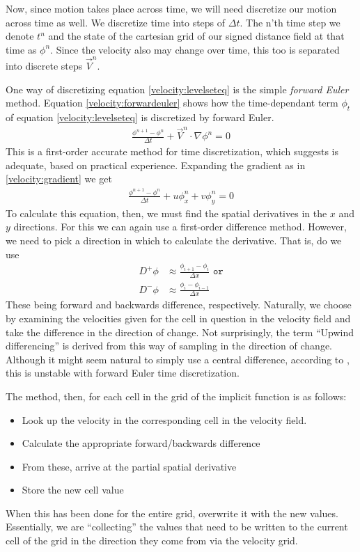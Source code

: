 Now, since motion takes place across time, we will need discretize our
motion across time as well. We discretize time into steps of $\Delta
t$. The n'th time step we denote $t^n$ and the state of the cartesian
grid of our signed distance field at that time as $\phi^n$. Since the
velocity also may change over time, this too is separated into
discrete steps $\vec{V}^n$.

One way of discretizing equation \ref{velocity:levelseteq} is the
simple \emph{forward Euler} method. Equation
\vref{velocity:forwardeuler} shows how the time-dependant term
$\phi_t$ of equation \ref{velocity:levelseteq} is discretized by
forward Euler.
\begin{align}
  \label{velocity:forwardeuler}
  \frac{\phi^{n+1}-\phi^n}{\Delta t}+\vec{V}^n\cdot\nabla\phi^n = 0
\end{align}
This is a first-order accurate method for time discretization, which
 suggests is adequate, based on practical
experience.  Expanding the gradient as in \vref{velocity:gradient} we
get
\begin{align}
  \label{velocity:forwardeuler}
  \frac{\phi^{n+1}-\phi^n}{\Delta t}+u\phi_{x}^n + v\phi_{y}^n = 0
\end{align}
To calculate this equation, then, we must find the spatial derivatives
in the $x$ and $y$ directions. For this we can again use a first-order
difference method. However, we need to pick a direction in which to
calculate the derivative. That is, do we use
\begin{align}\label{eq:fweuler}
  D^+\phi &\approx  \frac{\phi_{i+1} - \phi_i}{\Delta x} \texttt{ or}\\
  D^-\phi &\approx  \frac{\phi_i - \phi_{i-1}}{\Delta x}
\end{align}
These being forward and backwards difference, respectively. Naturally,
we choose by examining the velocities given for the cell in question
in the velocity field and take the difference in the direction of
change. Not surprisingly, the term ``Upwind differencing'' is derived
from this way of sampling in the direction of change.  Although it
might seem natural to simply use a central difference, according to
, this is unstable with forward Euler time
discretization.

The method, then, for each cell in the grid of the implicit function
is as follows:
\begin{itemize}
\item Look up the velocity in the corresponding cell in the velocity
  field.
\item Calculate the appropriate forward/backwards difference
\item From these, arrive at the partial spatial derivative
\item Store the new cell value
\end{itemize}
When this has been done for the entire grid, overwrite it with the new
values.  Essentially, we are ``collecting'' the values that need to be
written to the current cell of the grid in the direction they come
from via the velocity grid.

